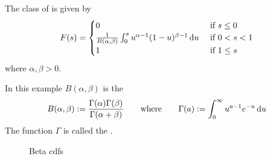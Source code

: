 \begin{frame}

    \vspace{2em}
    \Eg
    The class of  is given by 
    \begin{equation*}
        F(s) =
        \begin{cases}
            0 & \text{ if } s \leq 0
            \\
            \frac{1}{B(\alpha, \beta)}
                \int_0^s u^{\alpha-1} (1-u)^{\beta-1} \mathop{}\!\mathrm{d} u
                & \text{ if } 0 < s < 1
            \\
            1   & \text{ if } 1 \leq s
        \end{cases}
    \end{equation*}
    where $\alpha, \beta > 0$. 

    In this example $B(\alpha, \beta)$ is the  
    \begin{equation*}
        B(\alpha, \beta) 
            := \frac{\Gamma(\alpha)\Gamma(\beta)}{\Gamma(\alpha + \beta)}
        \qquad \text{where} \qquad
        \Gamma(a) := \int_0^{\infty} u^{a-1} e^{-u} \mathop{}\!\mathrm{d} u
    \end{equation*}
    The function $\Gamma$ is called the . 

\end{frame}

\begin{frame}
    
    \vspace{2em}
    \begin{figure}
       \begin{center}
        \caption{\label{f:beta_cdfs} Beta {\sc cdf}s }
       \end{center}
    \end{figure}

\end{frame}

